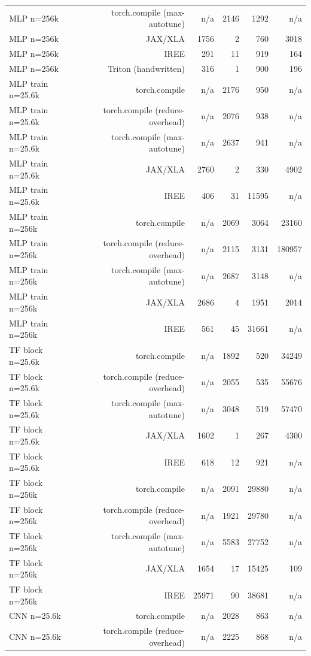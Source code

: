 \begin{tabular}{lrrrrr}
MLP n=256k & torch.compile (max-autotune) & n/a & 2146 & 1292 & n/a \\
MLP n=256k & JAX/XLA & 1756 & 2 & 760 & 3018 \\
MLP n=256k & IREE & 291 & 11 & 919 & 164 \\
MLP n=256k & Triton (handwritten) & 316 & 1 & 900 & 196 \\
MLP train n=25.6k & torch.compile & n/a & 2176 & 950 & n/a \\
MLP train n=25.6k & torch.compile (reduce-overhead) & n/a & 2076 & 938 & n/a \\
MLP train n=25.6k & torch.compile (max-autotune) & n/a & 2637 & 941 & n/a \\
MLP train n=25.6k & JAX/XLA & 2760 & 2 & 330 & 4902 \\
MLP train n=25.6k & IREE & 406 & 31 & 11595 & n/a \\
MLP train n=256k & torch.compile & n/a & 2069 & 3064 & 23160 \\
MLP train n=256k & torch.compile (reduce-overhead) & n/a & 2115 & 3131 & 180957 \\
MLP train n=256k & torch.compile (max-autotune) & n/a & 2687 & 3148 & n/a \\
MLP train n=256k & JAX/XLA & 2686 & 4 & 1951 & 2014 \\
MLP train n=256k & IREE & 561 & 45 & 31661 & n/a \\
TF block n=25.6k & torch.compile & n/a & 1892 & 520 & 34249 \\
TF block n=25.6k & torch.compile (reduce-overhead) & n/a & 2055 & 535 & 55676 \\
TF block n=25.6k & torch.compile (max-autotune) & n/a & 3048 & 519 & 57470 \\
TF block n=25.6k & JAX/XLA & 1602 & 1 & 267 & 4300 \\
TF block n=25.6k & IREE & 618 & 12 & 921 & n/a \\
TF block n=256k & torch.compile & n/a & 2091 & 29880 & n/a \\
TF block n=256k & torch.compile (reduce-overhead) & n/a & 1921 & 29780 & n/a \\
TF block n=256k & torch.compile (max-autotune) & n/a & 5583 & 27752 & n/a \\
TF block n=256k & JAX/XLA & 1654 & 17 & 15425 & 109 \\
TF block n=256k & IREE & 25971 & 90 & 38681 & n/a \\
CNN n=25.6k & torch.compile & n/a & 2028 & 863 & n/a \\
CNN n=25.6k & torch.compile (reduce-overhead) & n/a & 2225 & 868 & n/a \\

\end{tabular}

